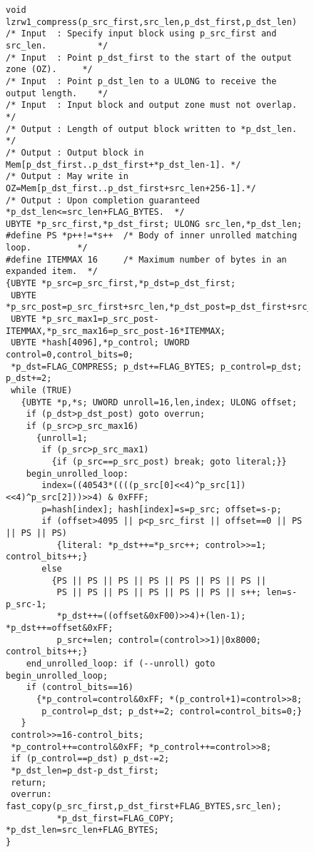 \begin{figure}
\startsmall
\begin{verbatim}
void lzrw1_compress(p_src_first,src_len,p_dst_first,p_dst_len)
/* Input  : Specify input block using p_src_first and src_len.          */
/* Input  : Point p_dst_first to the start of the output zone (OZ).     */
/* Input  : Point p_dst_len to a ULONG to receive the output length.    */
/* Input  : Input block and output zone must not overlap.               */
/* Output : Length of output block written to *p_dst_len.               */
/* Output : Output block in Mem[p_dst_first..p_dst_first+*p_dst_len-1]. */
/* Output : May write in OZ=Mem[p_dst_first..p_dst_first+src_len+256-1].*/
/* Output : Upon completion guaranteed *p_dst_len<=src_len+FLAG_BYTES.  */
UBYTE *p_src_first,*p_dst_first; ULONG src_len,*p_dst_len;
#define PS *p++!=*s++  /* Body of inner unrolled matching loop.         */
#define ITEMMAX 16     /* Maximum number of bytes in an expanded item.  */
{UBYTE *p_src=p_src_first,*p_dst=p_dst_first;
 UBYTE *p_src_post=p_src_first+src_len,*p_dst_post=p_dst_first+src_len;
 UBYTE *p_src_max1=p_src_post-ITEMMAX,*p_src_max16=p_src_post-16*ITEMMAX;
 UBYTE *hash[4096],*p_control; UWORD control=0,control_bits=0;
 *p_dst=FLAG_COMPRESS; p_dst+=FLAG_BYTES; p_control=p_dst; p_dst+=2;
 while (TRUE)
   {UBYTE *p,*s; UWORD unroll=16,len,index; ULONG offset;
    if (p_dst>p_dst_post) goto overrun;
    if (p_src>p_src_max16)
      {unroll=1;
       if (p_src>p_src_max1)
         {if (p_src==p_src_post) break; goto literal;}}
    begin_unrolled_loop:
       index=((40543*((((p_src[0]<<4)^p_src[1])<<4)^p_src[2]))>>4) & 0xFFF;
       p=hash[index]; hash[index]=s=p_src; offset=s-p;
       if (offset>4095 || p<p_src_first || offset==0 || PS || PS || PS)
          {literal: *p_dst++=*p_src++; control>>=1; control_bits++;}
       else
         {PS || PS || PS || PS || PS || PS || PS ||
          PS || PS || PS || PS || PS || PS || s++; len=s-p_src-1;
          *p_dst++=((offset&0xF00)>>4)+(len-1); *p_dst++=offset&0xFF;
          p_src+=len; control=(control>>1)|0x8000; control_bits++;}
    end_unrolled_loop: if (--unroll) goto begin_unrolled_loop;
    if (control_bits==16)
      {*p_control=control&0xFF; *(p_control+1)=control>>8;
       p_control=p_dst; p_dst+=2; control=control_bits=0;}
   }
 control>>=16-control_bits;
 *p_control++=control&0xFF; *p_control++=control>>8;
 if (p_control==p_dst) p_dst-=2;
 *p_dst_len=p_dst-p_dst_first;
 return;
 overrun: fast_copy(p_src_first,p_dst_first+FLAG_BYTES,src_len);
          *p_dst_first=FLAG_COPY; *p_dst_len=src_len+FLAG_BYTES;
}
\end{verbatim}
\endsmall
{}
\end{figure}

